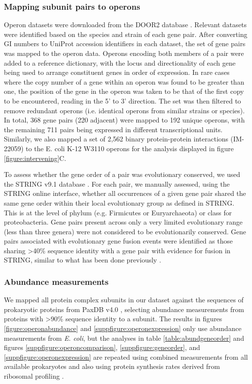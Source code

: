 \documentclass[a4paper,11pt,twoside,openright]{scrbook}
\begin{document}
\subsubsection{Mapping subunit pairs to operons}
Operon datasets were downloaded from the DOOR2 database \cite{Mao2014}. Relevant
datasets were identified based on the species and strain of each gene pair.
After converting GI numbers to UniProt accession identifiers in each dataset,
the set of gene pairs was mapped to the operon data. Operons encoding both
members of a pair were added to a reference dictionary, with the locus and
directionality of each gene being used to arrange constituent genes in order of
expression. In rare cases where the copy number of a gene within an operon was
found to be greater than one, the position of the gene in the operon was taken
to be that of the first copy to be encountered, reading in the 5' to 3'
direction. The set was then filtered to remove redundant operons (i.e. identical
operons from similar strains or species). In total, 368 gene pairs (220
adjacent) were mapped to 192 unique operons, with the remaining 711 pairs being
expressed in different transcriptional units. Similarly, we also mapped a set of
2,562 binary protein-protein interactions (IM-22059) \cite{Rajagopala2014} to
the E. coli K-12 W3110 operons for the analysis displayed in figure
\ref{figure:intervening}C.

To assess whether the gene order of a pair was evolutionary conserved, we used
the STRING v9.1 database \cite{Franceschini2013}. For each pair, we manually
assessed, using the STRING online interface, whether all occurrences of a given
gene pair shared the same gene order within their local evolutionary group as
defined in STRING. This is at the level of phylum (e.g. Firmicutes or
Euryarchaeota) or class for proteobacteria. Gene pairs present across only a
very limited evolutionary range (less than three genera) were not considered to
be evolutionarily conserved. Gene pairs associated with evolutionary gene fusion
events were identified as those sharing >40\% sequence identity with a gene pair
with evidence for fusion in STRING, similar to what has been done previously
\cite{Marsh2013}.

\subsubsection{Abundance measurements}
We mapped all protein complex subunits in our dataset against the sequences of
prokaryotic proteins from PaxDB v4.0 \cite{Wang2015}, selecting abundance
measurements from proteins with >90\% sequence identity to a subunit. The
results in figures \ref{figure:operonabundance} and
\ref{suppfigure:operonexpression} only use abundance measurements from
\textit{E. coli}, but the analyses in table \ref{table:abundgeneorder} and
figures \ref{suppfigure:operoncomparison}, \ref{suppfigure:geneorder}, and
\ref{suppfigure:operonexpression} are repeated using combined measurements from
all available prokaryotes and also using protein synthesis rates derived from
ribosomal profiling \cite{Li2014b}.
\end{document}
